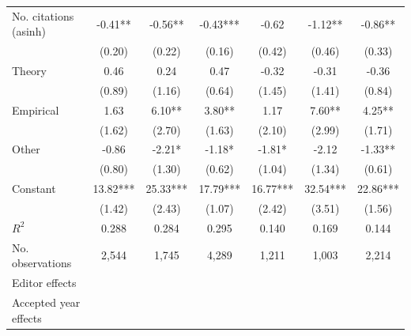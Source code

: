 \begin{table}
\begin{threeparttable}
\begin{tabular}{p{3.78cm}S@{}S@{}S@{}S@{}S@{}S@{}}
            No. citations (asinh)         &       -0.41** &       -0.56** &       -0.43***&       -0.62   &       -1.12** &       -0.86** \\
                                          &      (0.20)   &      (0.22)   &      (0.16)   &      (0.42)   &      (0.46)   &      (0.33)   \\
            Theory                        &        0.46   &        0.24   &        0.47   &       -0.32   &       -0.31   &       -0.36   \\
                                          &      (0.89)   &      (1.16)   &      (0.64)   &      (1.45)   &      (1.41)   &      (0.84)   \\
            Empirical                     &        1.63   &        6.10** &        3.80** &        1.17   &        7.60** &        4.25** \\
                                          &      (1.62)   &      (2.70)   &      (1.63)   &      (2.10)   &      (2.99)   &      (1.71)   \\
            Other                         &       -0.86   &       -2.21*  &       -1.18*  &       -1.81*  &       -2.12   &       -1.33** \\
                                          &      (0.80)   &      (1.30)   &      (0.62)   &      (1.04)   &      (1.34)   &      (0.61)   \\
            Constant                      &       13.82***&       25.33***&       17.79***&       16.77***&       32.54***&       22.86***\\
                                          &      (1.42)   &      (2.43)   &      (1.07)   &      (2.42)   &      (3.51)   &      (1.56)   \\
            \midrule
            \(R^2\)                       &       0.288   &       0.284   &       0.295   &       0.140   &       0.169   &       0.144   \\
            No. observations              &       2,544   &       1,745   &       4,289   &       1,211   &       1,003   &       2,214   \\
            \midrule
            Editor effects        &           {}   &           {}   &           {}   &           {}   &           {}   &           {}   \\
            Accepted year effects         &           {}   &           {}   &               &           {}   &           {}   &               \\

\end{tabular}
\end{threeparttable}
\end{table}
